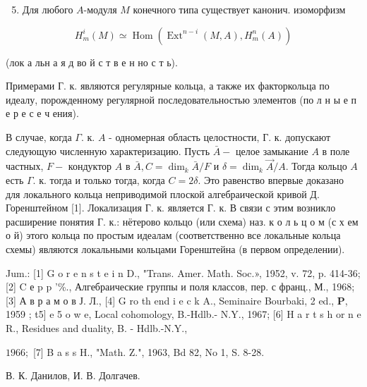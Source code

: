 \documentclass[10pt]{article}
\begin{document}
\begin{enumerate}

  \setcounter{enumi}{4}

  \item Для любого $A$-модуля $M$ конечного типа существует канонич. изоморфизм

\end{enumerate}



\[

H_{m}^{i}(M) \simeq \operatorname{Hom}\left(\operatorname{Ext}^{n-i}(M, A), H_{m}^{n}(A)\right)

\]



(лок а льн а я д во й с т в е н но с т ь).



Примерами Г. к. являются регулярные кольца, а также их факторкольца по идеалу, порожденному регулярной последовательностью элементов (по л н ы е п е р е с е ч ения).



В случае, когда $\Gamma$. к. $A$ - одномерная область целостности, Г. к. допускают следующую численную характеризацию. Пусть $\bar{A}-$ целое замыкание $A$ в поле частных, $F-$ кондуктор $A$ в $\bar{A}, C=\operatorname{dim}_{k} \bar{A} / F$ и $\delta=\operatorname{dim}_{k} \vec{A} / A$. Тогда кольцо $A$ есть $\Gamma$. к. тогда и только тогда, когда $C=2 \delta$. Это равенство впервые доказано для локального кольца неприводимой плоской алгебраической кривой Д. Горенштейном [1]. Локализация Г. к. является Г. к. В связи с этим возникло расширение понятия Г. к.: нётерово кольцо (или схема) наз. к о л ь ц о м (с х ем о й) этого кольца по простым идеалам (соответственно все локальные кольца схемы) являются локальными кольцами Горенштейна (в первом определении).



Jum.: [1] G o r e n s t e i n D., "Trans. Amer. Math. Soc.», 1952, v. 72, p. 414-36; [2] C е p p '\%., Алгебраические группы и поля классов, пер. с франц., М., 1968; [3] А в р а м о в Ј. Л., [4] G ro th end i e c k A., Seminaire Bourbaki, 2 ed., $\mathbf{P}$, 1959 ; t5] e 5 o w e, Local cohomology, B.-Hdlb.- N.Y., 1967; [6] H a r t s h or n e R., Residues and duality, B. - Hdlb.-N.Y.,

$1966 ;$ [7] B a s s H., "Math. Z.", 1963, Bd 82, No 1, S. 8-28.



В. К. Данилов, И. В. Долгачев.
\end{document}
